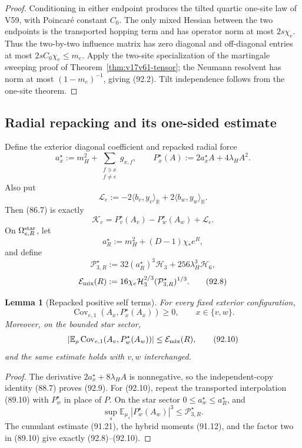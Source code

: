 \documentclass[11pt]{article}
\newtheorem{lemma}[theorem]{Lemma}
\theoremstyle{remark}
\begin{document}
\begin{proof}
Conditioning in either endpoint produces the tilted quartic one-site
law of V59, with Poincar\'e constant \(C_0\).  The only mixed Hessian
between the two endpoints is the transported hopping term and has
operator norm at most \(2s\chi_e\).  Thus the two-by-two influence
matrix has zero diagonal and off-diagonal entries at most
\(2sC_0\chi_e\leq m_e\).  Apply the two-site specialization of the
martingale sweeping proof of Theorem~\ref{thm:v17v61-tensor}; the
Neumann resolvent has norm at most \((1-m_e)^{-1}\), giving (92.2).
Tilt independence follows from the one-site theorem.
\end{proof}

\subsection{Radial repacking and its one-sided estimate}

Define the exterior diagonal coefficient and repacked radial force
\[
 a_x^\star:=m_H^2+
 \sum_{\substack{f\ni x\\f\ne e}}g_{x,f},
 \qquad
 P_x^\star(A):=2a_x^\star A+4\lambda_HA^2.          \tag{92.3}
\]
Also put
\[
 \mathcal L_e
 :=-2\langle b_v,y_v\rangle_{\mathbb R}
    +2\langle b_w,y_w\rangle_{\mathbb R}.           \tag{92.4}
\]
Then (86.7) is exactly
\[
 \mathcal K_e=P_v^\star(A_v)-P_w^\star(A_w)
                    +\mathcal L_e.                  \tag{92.5}
\]
On \(\Omega_{e,R}^{\rm star}\), let
\[
 a_R^\star:=m_H^2+(D-1)\chi_*e^R,                  \tag{92.6}
\]
and define
\[
 \mathcal P_{3,R}^\star
 :=32(a_R^\star)^3\mathcal H_3
   +256\lambda_H^3\mathcal H_6,                    \tag{92.7}
\]
\[
 \mathcal E_{\rm mix}(R)
 :=16\chi_e\mathcal H_3^{2/3}
              (\mathcal P_{3,R}^\star)^{1/3}.       \tag{92.8}
\]

\begin{lemma}[Repacked positive self terms]
\label{lem:v17v92-repacked-self}
For every fixed exterior configuration,
\[
 \operatorname{Cov}_{e,1}(A_x,P_x^\star(A_x))\geq0,
 \qquad x\in\{v,w\}.                               \tag{92.9}
\]
Moreover, on the bounded star sector,
\[
 \left|\mathbb E_\rho
  \operatorname{Cov}_{e,1}(A_v,P_w^\star(A_w))\right|
 \leq\mathcal E_{\rm mix}(R),                       \tag{92.10}
\]
and the same estimate holds with \(v,w\) interchanged.
\end{lemma}

\begin{proof}
The derivative
\(2a_x^\star+8\lambda_HA\) is nonnegative, so the independent-copy
identity (88.7) proves (92.9).  For (92.10), repeat the transported
interpolation (89.10) with \(P_w^\star\) in place of \(P\).  On the
star sector \(0\leq a_w^\star\leq a_R^\star\), and
\[
 \sup_s\mathbb E_{\mu_s}|P_w^\star(A_w)|^3
 \leq\mathcal P_{3,R}^\star.                       \tag{92.11}
\]
The cumulant estimate (91.21), the hybrid moments (91.12), and the
factor two in (89.10) give exactly (92.8)--(92.10).
\end{proof}
\end{document}
